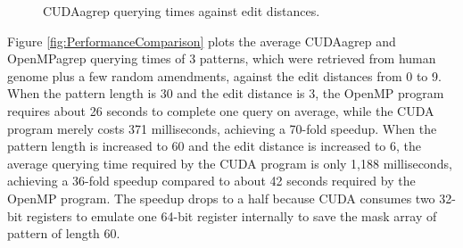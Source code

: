 \begin{figure}
\centering
{}
\caption{CUDAagrep querying times against edit distances.}
\label{fig:CUDAagrepQueryingTime}
\end{figure}

Figure \ref{fig:PerformanceComparison} plots the average CUDAagrep and OpenMPagrep querying times of 3 patterns, which were retrieved from human genome plus a few random amendments, against the edit distances from 0 to 9. When the pattern length is 30 and the edit distance is 3, the OpenMP program requires about 26 seconds to complete one query on average, while the CUDA program merely costs 371 milliseconds, achieving a 70-fold speedup. When the pattern length is increased to 60 and the edit distance is increased to 6, the average querying time required by the CUDA program is only 1,188 milliseconds, achieving a 36-fold speedup compared to about 42 seconds required by the OpenMP program. The speedup drops to a half because CUDA consumes two 32-bit registers to emulate one 64-bit register internally to save the mask array of pattern of length 60.

